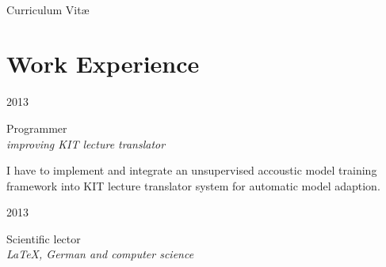 \documentclass[a4paper,10pt]{article} %
\begin{document}
\color{text1} %


\par{\\ %
{\Huge \color{headings} Curriculum {Vit\ae}\\[15pt]\par}
	

\begin{minipage}[t]{0.5\textwidth}
\vspace{0pt} %
	

\section{Work Experience} 


{\raggedleft\textsc{2013}\par}

{\raggedright\large Programmer\\
\textit{improving KIT lecture translator}\\[5pt]}

\normalsize{I have to implement and integrate an unsupervised accoustic model training framework into KIT lecture translator system for automatic model adaption.}\\


{\raggedleft\textsc{2013}\par}

{\raggedright\large Scientific lector\\
\textit{\LaTeX{}, German and computer science}\\[5pt]}


\end{minipage}}
\end{document}
